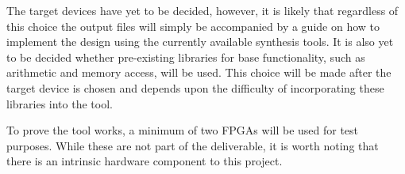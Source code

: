 The target devices have yet to be decided, however, it is likely that regardless of this choice the output files will simply be accompanied by a guide on how to implement the design using the currently available synthesis tools. It is also yet to be decided whether pre-existing libraries for base functionality, such as arithmetic and memory access, will be used. This choice will be made after the target device is chosen and depends upon the difficulty of incorporating these libraries into the tool.

To prove the tool works, a minimum of two FPGAs will be used for test purposes. While these are not part of the deliverable, it is worth noting that there is an intrinsic hardware component to this project.
